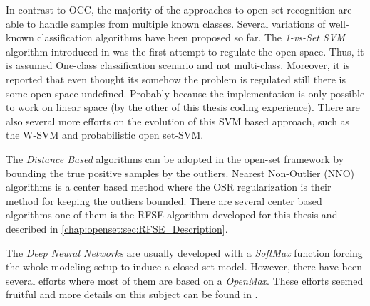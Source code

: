 In contrast to OCC, the majority of the approaches to open-set recognition are able to handle samples from multiple known classes. Several variations of well-known classification algorithms have been proposed so far. The \textit{1-vs-Set SVM} algorithm introduced in \parencite{scheirer2013toward} was the first attempt to regulate the open space. Thus, it is assumed One-class classification scenario and not multi-class. Moreover, it is reported that even thought its somehow the problem is regulated still there is some open space undefined. Probably because the implementation is only possible to work on linear space (by the other of this thesis coding experience). There are also several more efforts on the evolution of this SVM based approach, such as the W-SVM and probabilistic open set-SVM.

The \textit{Distance Based} algorithms can be adopted in the open-set framework by bounding the true positive samples by the outliers. Nearest Non-Outlier (NNO) algorithms is a center based method where the OSR regularization is their method for keeping the outliers bounded. There are several center based algorithms one of them is the RFSE algorithm developed for this thesis and described in \ref{chap:openset:sec:RFSE_Description}. 




The \textit{Deep Neural Networks} are usually developed with a \textit{SoftMax} function forcing the whole modeling setup to induce a closed-set model. However, there have been several efforts where most of them are based on a \textit{OpenMax}. These efforts seemed fruitful and more details on this subject can be found in \parencite{geng2018recent}. 

